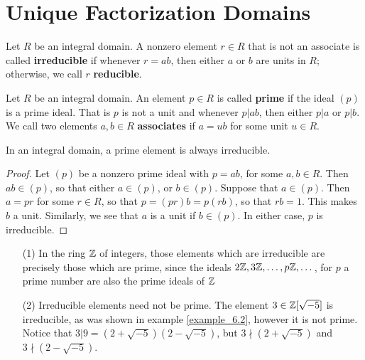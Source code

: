 \section{Unique Factorization Domains}
\label{section_6.3}

\begin{definition}
  Let $R$ be an integral domain. A nonzero element  $r \in R$ that is not an
  associate is called \textbf{irreducible} if whenever $r=ab$, then either $a$
  or $b$ are units in $R$; otherwise, we call $r$ \textbf{reducible}.
\end{definition}

\begin{definition}
  Let $R$ be an integral domain. An element $p \in R$ is called \textbf{prime}
  if the ideal $(p)$ is a prime ideal. That is $p$ is not a unit and whenever
  $p|ab$, then either  $p|a$ or $p|b$. We call two elements $a,b \in R$
  \textbf{associates} if $a=ub$ for some unit $u \in R$.
\end{definition}

\begin{lemma}\label{lemma_6.3.1}
  In an integral domain, a prime element is always irreducible.
\end{lemma}
\begin{proof}
  Let $(p)$ be a nonzero prime ideal with $p=ab$, for some  $a,b \in R$. Then
  $ab \in (p)$, so that either $a \in (p)$, or $b \in (p)$. Suppose that $a
  \in (p)$. Then $a=pr$ for some  $r \in R$, so that  $p=(pr)b=p(rb)$, so
  that $rb=1$. This makes $b$ a unit. Similarly, we see that $a$ is a unit if
  $b \in (p)$. In either case, $p$ is irreducible.
\end{proof}

\begin{example}\label{example_6.6}
  \begin{enumerate}
    \item[(1)] In the ring $\mathbb{Z}$ of integers, those elements which are
      irreducible are precisely those which are prime, since the ideals
      $2\mathbb{Z}, 3\mathbb{Z}, \dots, p\mathbb{Z}, \dots$, for  $p$ a prime number are also the
      prime ideals of $\mathbb{Z}$

    \item[(2)] Irreducible elements need not be prime. The element $3 \in
      \mathbb{Z}[\sqrt{-5}]$ is irreducible, as was shown in example
      \ref{example_6.2},
      however it is not prime. Notice that
      $3|9=(2+\sqrt{-5})(2-\sqrt{-5})$, but $3 \nmid (2+\sqrt{-5})$ and
      $3 \nmid (2-\sqrt{-5})$.
  \end{enumerate}
\end{example}

